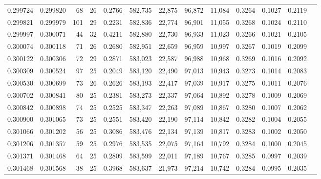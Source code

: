 \begin{tabular}{rrrrrrrrrrrrr}
0.299724 & 0.299820 &  68 &  26 &                                     0.2766 & 582,735 &  22,875 &  96,872 &  11,084 & 0.3264 & 0.1027 & 0.2119 \\
0.299821 & 0.299979 & 101 &  29 &                                     0.2231 & 582,836 &  22,774 &  96,901 &  11,055 & 0.3268 & 0.1024 & 0.2110 \\
0.299997 & 0.300071 &  44 &  32 &                                     0.4211 & 582,880 &  22,730 &  96,933 &  11,023 & 0.3266 & 0.1021 & 0.2105 \\
0.300074 & 0.300118 &  71 &  26 &                                     0.2680 & 582,951 &  22,659 &  96,959 &  10,997 & 0.3267 & 0.1019 & 0.2099 \\
0.300122 & 0.300306 &  72 &  29 &                                     0.2871 & 583,023 &  22,587 &  96,988 &  10,968 & 0.3269 & 0.1016 & 0.2092 \\
0.300309 & 0.300524 &  97 &  25 &                                     0.2049 & 583,120 &  22,490 &  97,013 &  10,943 & 0.3273 & 0.1014 & 0.2083 \\
0.300530 & 0.300699 &  73 &  26 &                                     0.2626 & 583,193 &  22,417 &  97,039 &  10,917 & 0.3275 & 0.1011 & 0.2076 \\
0.300702 & 0.300841 &  80 &  25 &                                     0.2381 & 583,273 &  22,337 &  97,064 &  10,892 & 0.3278 & 0.1009 & 0.2069 \\
0.300842 & 0.300898 &  74 &  25 &                                     0.2525 & 583,347 &  22,263 &  97,089 &  10,867 & 0.3280 & 0.1007 & 0.2062 \\
0.300900 & 0.301065 &  73 &  25 &                                     0.2551 & 583,420 &  22,190 &  97,114 &  10,842 & 0.3282 & 0.1004 & 0.2055 \\
0.301066 & 0.301202 &  56 &  25 &                                     0.3086 & 583,476 &  22,134 &  97,139 &  10,817 & 0.3283 & 0.1002 & 0.2050 \\
0.301206 & 0.301357 &  59 &  25 &                                     0.2976 & 583,535 &  22,075 &  97,164 &  10,792 & 0.3284 & 0.1000 & 0.2045 \\
0.301371 & 0.301468 &  64 &  25 &                                     0.2809 & 583,599 &  22,011 &  97,189 &  10,767 & 0.3285 & 0.0997 & 0.2039 \\
0.301468 & 0.301568 &  38 &  25 &                                     0.3968 & 583,637 &  21,973 &  97,214 &  10,742 & 0.3284 & 0.0995 & 0.2035 \\

\end{tabular}
